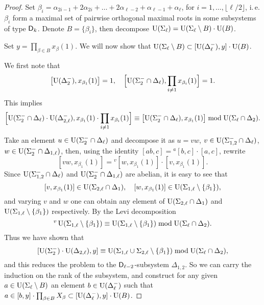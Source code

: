 \begin{proof}
Set $\beta_i = \alpha_{2i-1} + 2\alpha_{2i}+ \ldots + 2\alpha_{\ell-2} + \alpha_{\ell-1} + \alpha_\ell$, for $i=1,\ldots,\lfloor\ell/2\rfloor$, i.\,e. $\beta_i$ form a maximal set of pairwise orthogonal maximal roots in some subsystems of type $\mathsf{D}_{k}$. Denote $B=\{\beta_i\}$, then decompose $\operatorname{U}(\Sigma_\ell)=\operatorname{U}(\Sigma_\ell\setminus B)\cdot\operatorname{U}(B)$.

Set $y=\prod_{\beta\in B}x_\beta(1)$. We will now show that $\operatorname{U}(\Sigma_\ell\setminus B)\subset[\operatorname{U}(\Delta_\ell^-),y]\cdot\operatorname{U}(B)$.

We first note that
\[ \bigl[\operatorname{U}(\Delta_2^-),x_{\beta_1}(1)\bigr]=1,\quad \Bigl[\operatorname{U}(\Sigma_2^-\cap\Delta_\ell),\prod_{i\neq1}x_{\beta_i}(1)\Bigr]=1. \]
This implies
\[ \Bigl[ \operatorname{U}(\Sigma_2^-\cap\Delta_\ell)\cdot\operatorname{U}(\Delta_{2,\ell}^-), x_{\beta_1}(1)\cdot\prod_{i\neq1}x_{\beta_i}(1) \Bigr] \equiv \bigl[ \operatorname{U}(\Sigma_2^-\cap\Delta_\ell), x_{\beta_1}(1) \bigr] \bmod \operatorname{U}(\Sigma_\ell\cap\Delta_2). \]
Take an element $u\in\operatorname{U}(\Sigma_2^-\cap\Delta_\ell)$ and decompose it as $u=vw$, $v\in\operatorname{U}(\Sigma_{1,2}^-\cap\Delta_\ell)$, $w\in\operatorname{U}(\Sigma_2^-\cap\Delta_{1,\ell})$, then, using the identity $[ab,c]={}^a[b,c]\cdot[a,c]$, rewrite
\[ [vw,x_{\beta_1}(1)] = {}^v[w,x_{\beta_1}(1)]\cdot[v,x_{\beta_1}(1)].  \]
Since $\operatorname{U}(\Sigma_{1,2}^-\cap\Delta_\ell)$ and $\operatorname{U}(\Sigma_2^-\cap\Delta_{1,\ell})$ are abelian, it is easy to see that
\[ [v,x_{\beta_1}(1)]\in\operatorname{U}(\Sigma_{2,\ell}\cap\Delta_1), \quad [w,x_{\beta_1}(1)]\in\operatorname{U}(\Sigma_{1,\ell}\setminus\{\beta_1\}), \]
and varying $v$ and $w$ one can obtain any element of $\operatorname{U}(\Sigma_{2,\ell}\cap\Delta_1)$ and $\operatorname{U}(\Sigma_{1,\ell}\setminus\{\beta_1\})$ respectively. By the Levi decomposition
\[ {}^v\operatorname{U}(\Sigma_{1,\ell}\setminus\{\beta_1\}) \equiv \operatorname{U}(\Sigma_{1,\ell}\setminus\{\beta_1\}) \bmod \operatorname{U}(\Sigma_\ell\cap\Delta_2). \]
Thus we have shown that
\[ [\operatorname{U}(\Sigma_2^-)\cdot\operatorname{U}(\Delta_{2,\ell}),y] \equiv \operatorname{U}(\Sigma_{1,\ell}\cup\Sigma_{2,\ell}\setminus\{\beta_1\}) \bmod \operatorname{U}(\Sigma_\ell\cap\Delta_2), \]
and this reduces the problem to the $\mathsf{D}_{\ell-2}$-subsystem $\Delta_{1,2}$. So we can carry the induction on the rank of the subsystem, and construct for any given $a\in\operatorname{U}(\Sigma_\ell\setminus B)$ an element $b\in\operatorname{U}(\Delta_\ell^-)$ such that $a\in[b,y]\cdot\prod_{\beta\in B}X_\beta\subset[\operatorname{U}(\Delta_\ell^-),y]\cdot\operatorname{U}(B)$.
\end{proof}